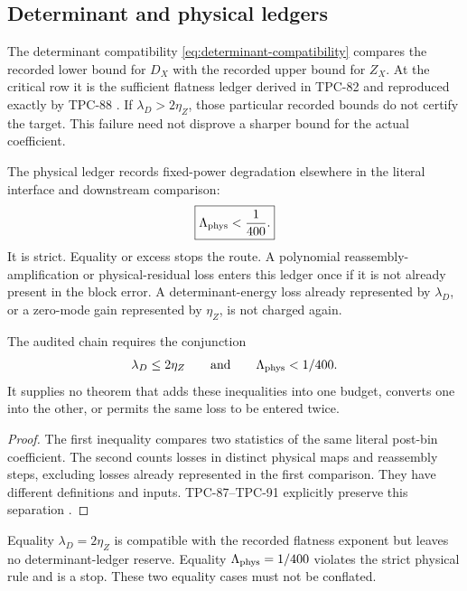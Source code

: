 \subsection{Determinant and physical ledgers}

The determinant compatibility
\eqref{eq:determinant-compatibility} compares the recorded lower
bound for \(D_X\) with the recorded upper bound for \(Z_X\).  At the
critical row it is the sufficient flatness ledger derived in
TPC-82 and reproduced exactly by TPC-88
\citep{WangTPC82,WangTPC88}.  If
\(\lambda_D>2\eta_Z\), those particular recorded bounds do not
certify the target.  This failure need not disprove a sharper bound
for the actual coefficient.

The physical ledger records fixed-power degradation elsewhere in the
literal interface and downstream comparison:
\begin{equation}
 \boxed{\Lambda_{\rm phys}<\frac1{400}.}
 \label{eq:strict-physical-ledger}
\end{equation}
It is strict.  Equality or excess stops the route.  A polynomial
reassembly-amplification or physical-residual loss enters this ledger
once if it is not already present in the block error.  A determinant-energy loss already
represented by \(\lambda_D\), or a zero-mode gain represented by
\(\eta_Z\), is not charged again.

\begin{theorem}
\label{thm:ledger-separation}
The audited chain requires the conjunction
\[
 \lambda_D\le2\eta_Z
 \qquad\text{and}\qquad
 \Lambda_{\rm phys}<1/400.
\]
It supplies no theorem that adds these inequalities into one budget,
converts one into the other, or permits the same loss to be entered
twice.
\end{theorem}

\begin{proof}
The first inequality compares two statistics of the same literal
post-bin coefficient.  The second counts losses in distinct physical
maps and reassembly steps, excluding losses already represented in
the first comparison.  They have different definitions and inputs.
TPC-87--TPC-91 explicitly preserve this separation
\citep{WangTPC87,WangTPC88,WangTPC89,WangTPC90,WangTPC91}.
\end{proof}

\begin{remark}[Equality]
Equality \(\lambda_D=2\eta_Z\) is compatible with the recorded
flatness exponent but leaves no determinant-ledger reserve.
Equality \(\Lambda_{\rm phys}=1/400\) violates the strict physical
rule and is a stop.  These two equality cases must not be conflated.
\end{remark}

